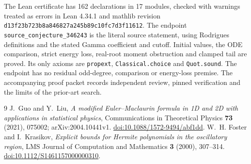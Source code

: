 \documentclass[11pt]{article}
\begin{document}
The Lean certificate has 162 declarations in 17 modules, checked with warnings treated as errors in Lean 4.34.1 and mathlib revision\newline
\texttt{d13f23b723b8a846827a245b89c10fc7d3f11612}. The endpoint \texttt{source\_conjecture\_346243} is the literal source statement, using Rodrigues definitions and the stated Gamma coefficient and cutoff. Initial values, the ODE comparison, strict energy loss, real-root moment obstruction and clamped tail are proved. Its only axioms are \texttt{propext}, \texttt{Classical.choice} and \texttt{Quot.sound}. The endpoint has no residual odd-degree, comparison or energy-loss premise. The accompanying proof packet records independent review, pinned verification and the limits of the prior-art search.

\small
\begin{thebibliography}{9}
 J.~Guo and Y.~Liu, \emph{A modified Euler--Maclaurin formula in 1D and 2D with applications in statistical physics}, Communications in Theoretical Physics \textbf{73} (2021), 075002; arXiv:2004.10441v1. \href{https://doi.org/10.1088/1572-9494/abf1dd}{doi:10.1088/1572-9494/abf1dd}.
 W.~H. Foster and I.~Krasikov, \emph{Explicit bounds for Hermite polynomials in the oscillatory region}, LMS Journal of Computation and Mathematics \textbf{3} (2000), 307--314. \href{https://doi.org/10.1112/S1461157000000310}{doi:10.1112/S1461157000000310}.
\end{thebibliography}
\end{document}
